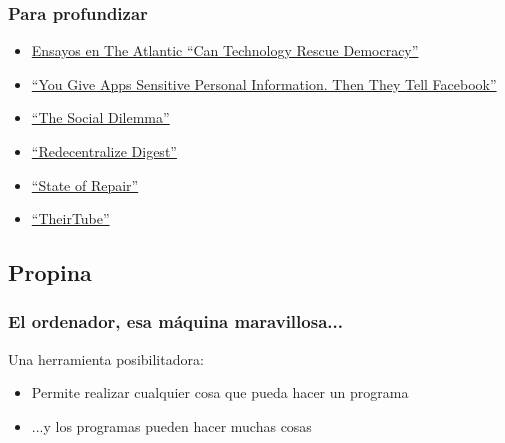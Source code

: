 \documentclass[17pt,aspectratio=169]{beamer}
\renewcommand{\secimage}{figs/bookpages}
\newcommand{\secimage}{figs/bookpages}
\begin{document}
\begin{frame}
\frametitle{Para profundizar}


{\small
\begin{itemize}
\item \href{https://blog.ericgoldman.org/archives/2017/06/recapping-the-can-technology-rescue-democracy-essay-series-at-the-atlantic.htm}{Ensayos en The Atlantic ``Can Technology Rescue Democracy''}
\item \href{https://www.wsj.com/articles/you-give-apps-sensitive-personal-information-then-they-tell-facebook-11550851636}{``You Give Apps Sensitive Personal Information. Then They Tell Facebook''}
\item \href{https://www.thesocialdilemma.com/}{``The Social Dilemma''}
\item \href{https://redecentralize.org/redigest/}{``Redecentralize Digest''}
\item \href{https://www.vice.com/en/topic/state-of-repair}{``State of Repair''}
\item \href{http://www.their.tube/}{``TheirTube''}
\end{itemize}
}
\end{frame}


\renewcommand{\secimage}{figs/tipjar}
{\bf
  \textcolor[rgb]{1,1,1}{
    \section{Propina}
  }
}


\begin{frame}
\frametitle{El ordenador, esa máquina maravillosa...}

Una herramienta posibilitadora:

\begin{itemize}
\item Permite realizar cualquier cosa que pueda hacer un programa
\item ...y los programas pueden hacer muchas cosas
\end{itemize}


\end{frame}

\end{document}
